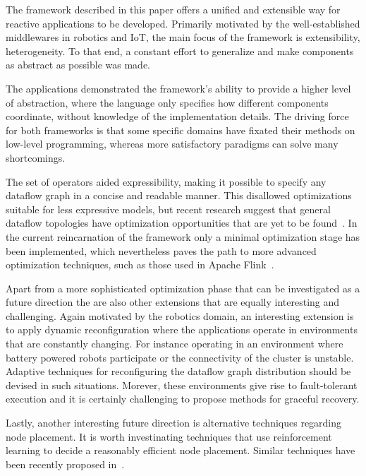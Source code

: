 \documentclass[sigplan,screen]{acmart}
\begin{document}
The framework described in this paper offers a unified and extensible way for
reactive applications to be developed. Primarily motivated by the well-established
middlewares in robotics and IoT, the main focus of the framework is extensibility,
heterogeneity. To that end, a constant effort to generalize and make components
as abstract as possible was made.

The applications demonstrated the framework's ability to provide a higher level
of abstraction, where the language only specifies how different components
coordinate, without knowledge of the implementation details. The driving force
for both frameworks is that some specific domains have fixated their methods
on low-level programming, whereas more satisfactory paradigms can solve many
shortcomings.

The set of operators aided expressibility, making it possible to specify any
dataflow graph in a concise and readable manner. This disallowed optimizations
suitable for less expressive models, but recent research suggest that general
dataflow topologies have optimization opportunities that are yet to be
found~\cite{blackbox}. In the current reincarnation of the framework only
a minimal optimization stage has been implemented, which nevertheless paves
the path to more advanced optimization techniques, such as those used in
Apache Flink~\cite{blackbox}.

Apart from a more sophisticated optimization phase that can be investigated
as a future direction the are also other extensions that are equally interesting
and challenging. Again motivated by the robotics domain, an interesting extension
is to apply dynamic reconfiguration where the applications operate in
environments that are constantly changing. For instance operating in an environment
where battery powered robots participate or the connectivity of the cluster is unstable.
Adaptive techniques for reconfiguring the dataflow graph distribution should be
devised in such situations. Morever, these environments give rise to fault-tolerant
execution and it is certainly challenging to propose methods for graceful recovery.

Lastly, another interesting future direction is alternative techniques regarding
node placement. It is worth investinating techniques that use reinforcement learning
to decide a reasonably efficient node placement. Similar techniques have been
recently proposed in~\cite{DBLP:conf/icml/MirhoseiniPLSLZ17}.



\end{document}
